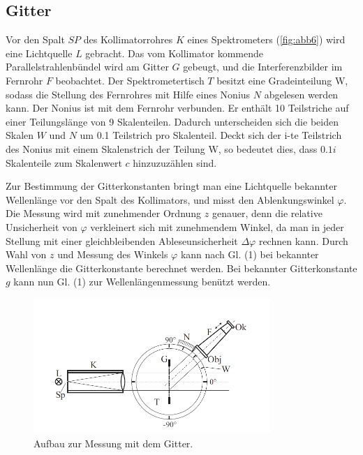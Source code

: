 \documentclass[11pt,ngerman]{scrartcl}
\begin{document}
\subsection{Gitter}

Vor den Spalt $SP$ des Kollimatorrohres $K$ eines Spektrometers (\autoref{fig:abb6}) wird eine Lichtquelle $L$
gebracht. Das vom Kollimator kommende Parallelstrahlenbündel wird am Gitter $G$ gebeugt, und
die Interferenzbilder im Fernrohr $F$ beobachtet. Der Spektrometertisch $T$ besitzt eine Gradeinteilung
W, sodass die Stellung des Fernrohres mit Hilfe eines Nonius $N$ abgelesen werden kann.
Der Nonius ist mit dem Fernrohr verbunden. Er enthält 10 Teilstriche auf einer Teilungslänge
von 9 Skalenteilen. Dadurch unterscheiden sich die beiden Skalen $W$ und $N$ um 0.1 Teilstrich
pro Skalenteil. Deckt sich der i-te Teilstrich des Nonius mit einem Skalenstrich der Teilung W,
so bedeutet dies, dass $0.1i$ Skalenteile zum Skalenwert $c$ hinzuzuzählen sind.

Zur Bestimmung der Gitterkonstanten bringt man eine Lichtquelle bekannter Wellenlänge vor
den Spalt des Kollimators, und misst den Ablenkungswinkel $\varphi$. Die Messung wird mit zunehmender
Ordnung $z$ genauer, denn die relative Unsicherheit von $\varphi$ verkleinert sich mit zunehmendem
Winkel, da man in jeder Stellung mit einer gleichbleibenden Ableseunsicherheit $\Delta \varphi$
rechnen kann. Durch Wahl von $z$ und Messung des Winkels $\varphi$ kann nach Gl. (1) bei bekannter
Wellenlänge die Gitterkonstante berechnet werden. Bei bekannter Gitterkonstante $g$ kann nun
Gl. (1) zur Wellenlängenmessung benützt werden.

\begin{figure}[H]
	\begin{center}
		\includegraphics[width=0.8\textwidth]{abb6}
	\end{center}
	\caption{Aufbau zur Messung mit dem Gitter.}
	\label{fig:abb6}
\end{figure}
\end{document}
